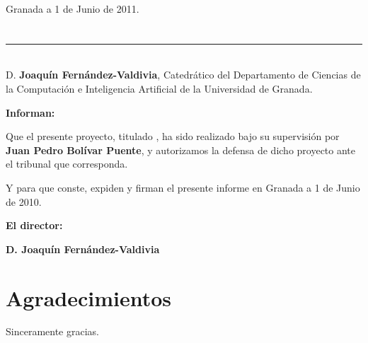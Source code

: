 \vspace{2cm}

\begin{flushright}
Granada a 1 de Junio de 2011.
\end{flushright}


\chapter*{}
\thispagestyle{empty}

\noindent\rule[-1ex]{\textwidth}{2pt}\\[4.5ex]

D. \textbf{Joaquín Fernández-Valdivia}, Catedrático del Departamento
de Ciencias de la Computación e Inteligencia Artificial de la
Universidad de Granada.  \vspace{0.5cm}


\textbf{Informan:}
\vspace{0.5cm}

Que el presente proyecto, titulado \textit{\textbf{\myTitle}}, ha sido
realizado bajo su supervisión por \textbf{Juan Pedro Bolívar Puente}, y
autorizamos la defensa de dicho proyecto ante el tribunal que
corresponda.
\vspace{0.5cm}

Y para que conste, expiden y firman el presente informe en Granada a 1
de Junio de 2010.
\vspace{1cm}

\textbf{El director:}
\vspace{5cm}

\noindent 
\textbf{D. Joaquín Fernández-Valdivia}%

\chapter*{Agradecimientos}
\thispagestyle{empty}
\vspace{1cm}


\vspace{3cm}
\noindent Sinceramente gracias.


